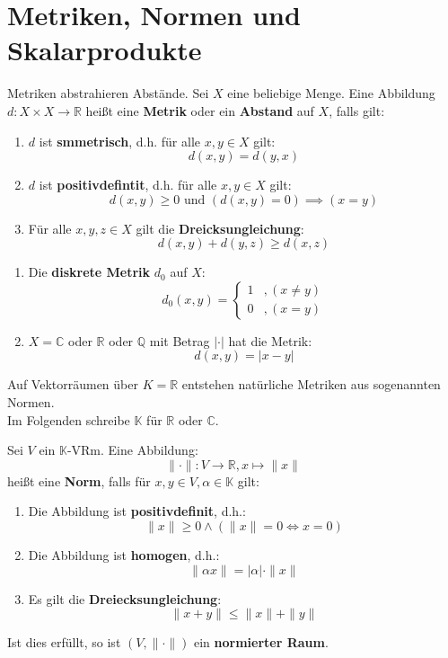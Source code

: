 \documentclass[parskip,a4paper,twoside,DIV15,BCOR12mm]{scrbook}
\begin{document}
\chapter{Metriken, Normen und Skalarprodukte}
\begin{definition}
Metriken abstrahieren Abstände. Sei $X$ eine beliebige Menge. Eine Abbildung
$d:X\times X\to \mathbb{R}$ heißt eine \textbf{Metrik} oder ein \textbf{Abstand}
auf $X$, falls gilt:
\begin{enumerate}
\item $d$ ist \textbf{smmetrisch}, d.h. für alle $x,y\in X$ gilt:
\[d(x,y)=d(y,x)\]
\item $d$ ist \textbf{positivdefintit}, d.h. für alle $x,y\in X$ gilt:
\[d(x,y)\ge 0 \text{ und } (d(x,y)=0)\implies (x=y)\]
\item Für alle $x,y,z\in X$ gilt die \textbf{Dreicksungleichung}:
\[d(x,y)+d(y,z)\ge d(x,z)\]
\end{enumerate}
\end{definition}

\begin{example}
\begin{enumerate}
\item Die \textbf{diskrete Metrik} $d_0$ auf $X$:
\[d_0(x,y)=\begin{cases}
1&,(x\ne y)\\
0&,(x=y)
\end{cases}
\]
\item $X=\mathbb{C}$ oder $\mathbb{R}$ oder $\mathbb{Q}$ mit Betrag $|\cdot|$ hat die
Metrik:
\[d(x,y)=|x-y|\]
\end{enumerate}
Auf Vektorräumen über $K=\mathbb{R}$ entstehen natürliche Metriken aus sogenannten Normen.\\
Im Folgenden schreibe $\mathbb{K}$ für $\mathbb{R}$ oder $\mathbb{C}$.
\end{example}

\begin{definition}
Sei $V$ ein $\mathbb{K}$-VRm. Eine Abbildung:
\[\|\cdot\|:V\to\mathbb{R},x\mapsto \|x\|\]
heißt eine \textbf{Norm}, falls für $x,y\in V,\alpha\in\mathbb{K}$ gilt:
\begin{enumerate}
\item Die Abbildung ist \textbf{positivdefinit}, d.h.:
\[\|x\|\ge 0 \wedge (\|x\|=0\iff x=0)\]
\item Die Abbildung ist \textbf{homogen}, d.h.:
\[\|\alpha x\| = |\alpha|\cdot \|x\|\]
\item Es gilt die \textbf{Dreiecksungleichung}:
\[\|x+y\|\le\|x\|+\|y\|\]
\end{enumerate}
Ist dies erfüllt, so ist $(V,\|\cdot\|)$ ein \textbf{normierter Raum}.
\end{definition}
\end{document}
